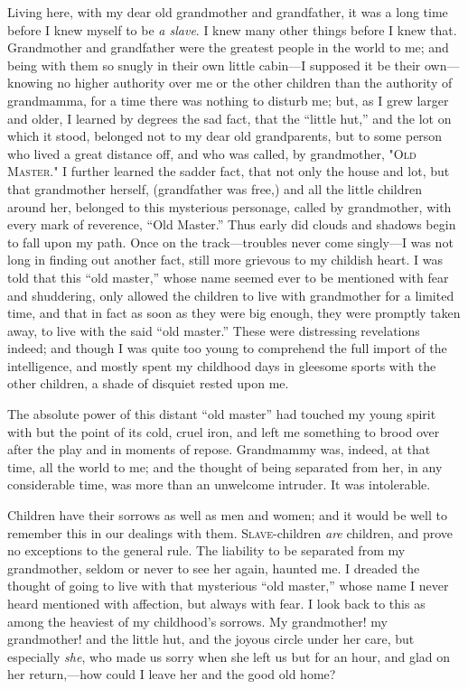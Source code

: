 Living here, with my dear old grandmother and grandfather, it was a long
time before I knew myself to be \emph{a slave}. I knew many other things
before I knew that. Grandmother and grandfather were the greatest people
in the world to me; and being with them so snugly in their own little
cabin---I supposed it be their own---knowing no higher authority over me
or the other children than the authority of grandmamma, for a time there
was nothing to disturb me; but, as I grew larger and older, I learned by
degrees the sad fact, that the ``little hut,'' and the lot on which it
stood, belonged not to my dear old grandparents, but to some person who
lived a great distance off, and who was called, by grandmother,
"\textsc{Old Master}." I further learned the sadder fact, that not only
the house and lot, but that grandmother herself, {}(grandfather was
free,) and all the little children around her, belonged to this
mysterious personage, called by grandmother, with every mark of
reverence, ``Old Master.'' Thus early did clouds and shadows begin to
fall upon my path. Once on the track---troubles never come singly---I
was not long in finding out another fact, still more grievous to my
childish heart. I was told that this ``old master,'' whose name seemed
ever to be mentioned with fear and shuddering, only allowed the children
to live with grandmother for a limited time, and that in fact as soon as
they were big enough, they were promptly taken away, to live with the
said ``old master.'' These were distressing revelations indeed; and
though I was quite too young to comprehend the full import of the
intelligence, and mostly spent my childhood days in gleesome sports with
the other children, a shade of disquiet rested upon me.

The absolute power of this distant ``old master'' had touched my young
spirit with but the point of its cold, cruel iron, and left me something
to brood over after the play and in moments of repose. Grandmammy was,
indeed, at that time, all the world to me; and the thought of being
separated from her, in any considerable time, was more than an unwelcome
intruder. It was intolerable.

Children have their sorrows as well as men and women; and it would be
well to remember this in our dealings with them. \textsc{Slave}-children
\emph{are} children, and prove no exceptions to the general rule. The
liability to be separated from my grandmother, seldom or never to see
her again, haunted me. I dreaded {}the thought of going to live with
that mysterious ``old master,'' whose name I never heard mentioned with
affection, but always with fear. I look back to this as among the
heaviest of my childhood's sorrows. My grandmother! my grandmother! and
the little hut, and the joyous circle under her care, but especially
\emph{she}, who made us sorry when she left us but for an hour, and glad
on her return,---how could I leave her and the good old home?

